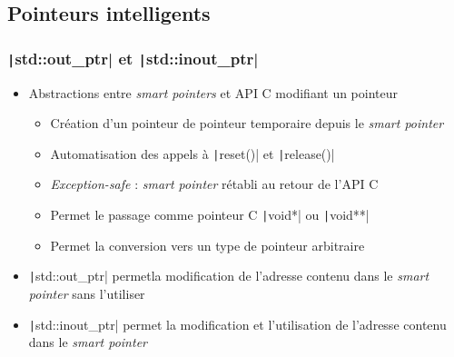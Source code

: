 \documentclass[C++.tex]{subfiles}
\begin{document}
\subsection*{Pointeurs intelligents}
\begin{frame}[fragile]
	\frametitle{\texttt|std::out_ptr| et \texttt|std::inout_ptr|}
	\begin{itemize}
		\item Abstractions entre \textit{smart pointers} et API C modifiant un pointeur


		\begin{itemize}
			\item Création d'un pointeur de pointeur temporaire depuis le \textit{smart pointer}
			\item Automatisation des appels à \texttt|reset()| et \texttt|release()|
			\item \textit{Exception-safe} : \textit{smart pointer} rétabli au retour de l'API C	


			\item Permet le passage comme pointeur C \texttt|void*| ou \texttt|void**|
			\item Permet la conversion vers un type de pointeur arbitraire
		\end{itemize}
		\item \texttt|std::out_ptr| permetla modification de l'adresse contenu dans le \textit{smart pointer} sans l'utiliser
		\item \texttt|std::inout_ptr| permet la modification et l'utilisation de l'adresse contenu dans le \textit{smart pointer}
	\end{itemize}
\end{frame}
\end{document}
